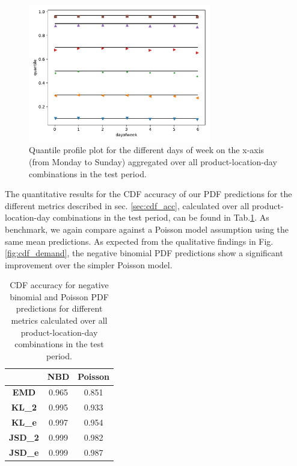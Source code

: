\documentclass[BCOR=1mm, DIV=calc,10pt,
twoside=true,
twocolumn,
headings=normal]{scrartcl}
\newcommand{\fig}{Fig.}
\newcommand{\tab}{Tab.}
\begin{document}
\begin{figure}
\begin{center}
\includegraphics[width=8cm]{../figures/invquant_dayofweek}
\caption{\label{fig:invquant_dayofweek} Quantile profile plot for the different days of week on the x-axis (from Monday to Sunday) aggregated over all product-location-day combinations in the test period.}
\end{center}
\end{figure}

The quantitative results for the CDF accuracy of our PDF predictions for the different metrics described in sec. \ref{sec:cdf_acc}, calculated over all product-location-day combinations in the test period, can be found in \tab \ref{tab:cdf_acc}. As benchmark, we again compare against a Poisson model assumption using the same mean predictions. As expected from the qualitative findings in \fig \ref{fig:cdf_demand}, the negative binomial PDF predictions show a significant improvement over the simpler Poisson model.

\begin{table}[h!]
\begin{center}
\caption{CDF accuracy for negative binomial and Poisson PDF predictions for different metrics calculated over all product-location-day combinations in the test period.}
\label{tab:cdf_acc}
\begin{tabular}{c|c|c}
 & \textbf{NBD} & \textbf{Poisson} \\
\hline
\textbf{EMD} & 0.965 & 0.851 \\
\textbf{KL\_2} & 0.995 & 0.933 \\
\textbf{KL\_e} & 0.997 & 0.954 \\
\textbf{JSD\_2} & 0.999 & 0.982 \\
\textbf{JSD\_e} & 0.999 & 0.987
\end{tabular}
\end{center}
\end{table}
\end{document}

